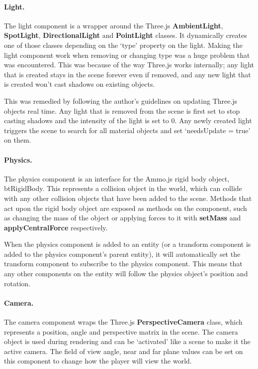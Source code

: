 	\paragraph{Light.}
	The light component is a wrapper around the Three.js \textbf{AmbientLight}, \textbf{SpotLight}, \textbf{DirectionalLight} and \textbf{PointLight} classes. It dynamically creates one of those classes depending on the `type' property on the light. Making the light component work when removing or changing type was a huge problem that was encountered. This was because of the way Three.js works internally; any light that is created stays in the scene forever even if removed, and any new light that is created won't cast shadows on existing objects.

	This was remedied by following the author's guidelines on updating Three.js objects real time.\cite{threejsupdates} Any light that is removed from the scene is first set to stop casting shadows and the intensity of the light is set to 0. Any newly created light triggers the scene to search for all material objects and set `needsUpdate = true' on them.

	\paragraph{Physics.}
	The physics component is an interface for the Ammo.js rigid body object, btRigidBody. This represents a collision object in the world, which can collide with any other collision objects that have been added to the scene. Methods that act upon the rigid body object are exposed as methods on the component, such as changing the mass of the object or applying forces to it with \textbf{setMass} and \textbf{applyCentralForce} respectively.

	When the physics component is added to an entity (or a transform component is added to the physics component's parent entity), it will automatically set the transform component to subscribe to the physics component. This means that any other components on the entity will follow the physics object's position and rotation.

	\paragraph{Camera.}
	The camera component wraps the Three.js \textbf{PerspectiveCamera} class, which represents a position, angle and perspective matrix in the scene. The camera object is used during rendering and can be `activated' like a scene to make it the active camera. The field of view angle, near and far plane values can be set on this component to change how the player will view the world.

